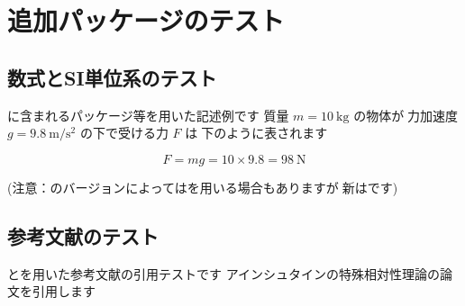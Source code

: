 \section{追加パッケージのテスト}

\subsection{数式とSI単位系のテスト}
に含まれるパッケージ等を用いた記述例です\p
質量 $m = \qty{10}{\kilo\gram}$ の物体が\c 重力加速度 $g = \qty{9.8}{\meter\per\second\squared}$ の下で受ける力 $F$ は\c 以下のように表されます\p

\begin{equation}
  F = mg = 10 \times 9.8 = \qty{98}{\newton}
\end{equation}

(注意：のバージョンによってはを用いる場合もありますが\c 最新はです\p )

\subsection{参考文献のテスト}
とを用いた参考文献の引用テストです\p
アインシュタインの特殊相対性理論の論文を引用します\cite{einstein1905}\p
